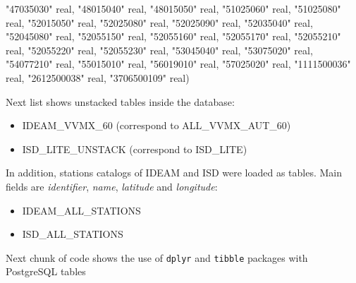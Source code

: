 \documentclass[12pt,oneside]{reedthesis}
\newenvironment{Shaded}{\begin{snugshade}}{\end{snugshade}}
\newcommand{\DataTypeTok}[1]{\textcolor[rgb]{0.13,0.29,0.53}{#1}}
\newcommand{\NormalTok}[1]{#1}
\newcommand{\OtherTok}[1]{\textcolor[rgb]{0.56,0.35,0.01}{#1}}
\providecommand{\tightlist}{%
  \setlength{\itemsep}{0pt}\setlength{\parskip}{0pt}}
\begin{document}
\begin{Shaded}
\begin{Highlighting}[]
     \OtherTok{"47035030"} \DataTypeTok{real}\NormalTok{, }\OtherTok{"48015040"} \DataTypeTok{real}\NormalTok{, }\OtherTok{"48015050"} \DataTypeTok{real}\NormalTok{, }\OtherTok{"51025060"} \DataTypeTok{real}\NormalTok{, }\OtherTok{"51025080"} \DataTypeTok{real}\NormalTok{, }\OtherTok{"52015050"} \DataTypeTok{real}\NormalTok{, }
     \OtherTok{"52025080"} \DataTypeTok{real}\NormalTok{, }\OtherTok{"52025090"} \DataTypeTok{real}\NormalTok{, }\OtherTok{"52035040"} \DataTypeTok{real}\NormalTok{, }\OtherTok{"52045080"} \DataTypeTok{real}\NormalTok{, }\OtherTok{"52055150"} \DataTypeTok{real}\NormalTok{, }\OtherTok{"52055160"} \DataTypeTok{real}\NormalTok{, }
     \OtherTok{"52055170"} \DataTypeTok{real}\NormalTok{, }\OtherTok{"52055210"} \DataTypeTok{real}\NormalTok{, }\OtherTok{"52055220"} \DataTypeTok{real}\NormalTok{, }\OtherTok{"52055230"} \DataTypeTok{real}\NormalTok{, }\OtherTok{"53045040"} \DataTypeTok{real}\NormalTok{, }\OtherTok{"53075020"} \DataTypeTok{real}\NormalTok{, }
     \OtherTok{"54077210"} \DataTypeTok{real}\NormalTok{, }\OtherTok{"55015010"} \DataTypeTok{real}\NormalTok{, }\OtherTok{"56019010"} \DataTypeTok{real}\NormalTok{, }\OtherTok{"57025020"} \DataTypeTok{real}\NormalTok{, }\OtherTok{"1111500036"} \DataTypeTok{real}\NormalTok{,}
     \OtherTok{"2612500038"} \DataTypeTok{real}\NormalTok{, }\OtherTok{"3706500109"} \DataTypeTok{real}\NormalTok{)}
\end{Highlighting}
\end{Shaded}
\normalsize

Next list shows unstacked tables inside the database:
\begin{itemize}
\tightlist
\item
  IDEAM\_VVMX\_60 (correspond to ALL\_VVMX\_AUT\_60)
\item
  ISD\_LITE\_UNSTACK (correspond to ISD\_LITE)
\end{itemize}
In addition, stations catalogs of IDEAM and ISD were loaded as tables. Main fields are \emph{identifier}, \emph{name}, \emph{latitude} and \emph{longitude}:
\begin{itemize}
\tightlist
\item
  IDEAM\_ALL\_STATIONS
\item
  ISD\_ALL\_STATIONS
\end{itemize}
Next chunk of code shows the use of \texttt{dplyr} and \texttt{tibble} packages with PostgreSQL tables

\scriptsize
\end{document}
